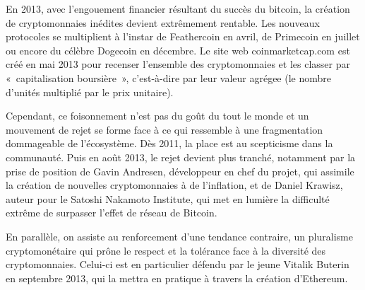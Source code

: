 
En 2013, avec l'engouement financier résultant du succès du bitcoin, la création de cryptomonnaies inédites devient extrêmement rentable. Les nouveaux protocoles se multiplient à l'instar de Feathercoin en avril, de Primecoin en juillet ou encore du célèbre Dogecoin en décembre. Le site web coinmarketcap.com est créé en mai 2013 pour recenser l'ensemble des cryptomonnaies et les classer par «~capitalisation boursière~», c'est-à-dire par leur valeur agrégee (le nombre d'unités multiplié par le prix unitaire).

Cependant, ce foisonnement n'est pas du goût du tout le monde et un mouvement de rejet se forme face à ce qui ressemble à une fragmentation dommageable de l'écosystème. Dès 2011, la place est au scepticisme dans la communauté. Puis en août 2013, le rejet devient plus tranché, notamment par la prise de position de Gavin Andresen, développeur en chef du projet, qui assimile la création de nouvelles cryptomonnaies à de l'inflation, et de Daniel Krawisz, auteur pour le Satoshi Nakamoto Institute, qui met en lumière la difficulté extrême de surpasser l'effet de réseau de Bitcoin.

En parallèle, on assiste au renforcement d'une tendance contraire, un pluralisme cryptomonétaire qui prône le respect et la tolérance face à la diversité des cryptomonnaies. Celui-ci est en particulier défendu par le jeune Vitalik Buterin en septembre 2013, qui la mettra en pratique à travers la création d'Ethereum.

